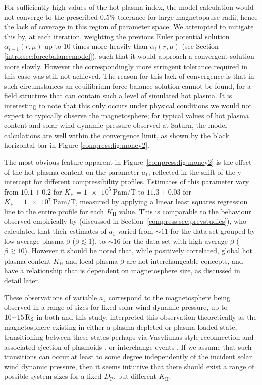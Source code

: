 For sufficiently high values of the hot plasma index, the model calculation would not converge to the prescribed 0.5$\%$ tolerance for large magnetopause radii, hence the lack of coverage in this region of parameter space. We attempted to mitigate this by, at each iteration, weighting the previous Euler potential solution $\alpha_{i-1}(r,\mu)$ up to 10 times more heavily than $\alpha_{i}(r,\mu)$ (see Section \ref{intro:sec:forcebalancemodel}), such that it would approach a convergent solution more slowly. However the correspondingly more stringent tolerance required in this case was still not achieved. The reason for this lack of convergence is that in such circumstances an equilibrium force-balance solution cannot be found, for a field structure that can contain such a level of simulated hot plasma. It is interesting to note that this only occurs under physical conditions we would not expect to typically observe the magnetosphere; for typical values of hot plasma content and solar wind dynamic pressure observed at Saturn, the model calculations are well within the convergence limit, as shown by the black horizontal bar in Figure \ref{compress:fig:money2}.

The most obvious feature apparent in Figure~\ref{compress:fig:money2} is the effect of the hot plasma content on the parameter $a_1$, reflected in the shift of the y-intercept for different compressibility profiles. Estimates of this parameter vary from $10.1 \pm 0.2$ for $K_\mathrm{H}=\SI{1e5}{\pascal\meter\per\tesla}$ to $11.3 \pm 0.03$ for $K_\mathrm{H}=\SI{1e7}{\pascal\meter\per\tesla}$, measured by applying a linear least squares regression line to the entire profile for each $K_\mathrm{H}$ value. This is comparable to the behaviour observed empirically by \citet{pilkington2015} (discussed in Section~\ref{compress:sec:prevstudies}), who calculated that their estimates of $a_1$ varied from ${\sim}11$ for the data set grouped by low average plasma $\beta$ ($\beta\lesssim 1$), to ${\sim}16$ for the data set with high average $\beta$ ($\beta\gtrsim 10$). However it should be noted that, while positively correlated, global hot plasma content $K_\mathrm{H}$ and local plasma $\beta$ are not interchangeable concepts, and have a relationship that is dependent on magnetosphere size, as discussed in detail later. 

These observations of variable $a_1$ correspond to the magnetosphere being observed in a range of sizes for fixed solar wind dynamic pressure, up to $10{\--}\SI{15}{R_S}$ in both \citet{pilkington2015} and this study. \citet{pilkington2015} interpreted this observation theoretically as the magnetosphere existing in either a plasma-depleted or plasma-loaded state, transitioning between these states perhaps via Vasyliunas-style reconnection and associated ejection of plasmoids \citep{vasyliunas1983}, or interchange events \citep{mitchell2015}. If we assume that such transitions can occur at least to some degree independently of the incident solar wind dynamic pressure, then it seems intuitive that there should exist a range of possible system sizes for a fixed $D_\mathrm{P}$, but different $K_\mathrm{H}$. 

